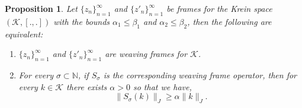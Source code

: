 \documentclass[article,12pt]{amsart}
\newtheorem{prop}[thm]{Proposition}
\begin{document}
\begin{prop}
Let $\{z_n\}_{n=1}^\infty$ and $\{z'_n\}_{n=1}^\infty$ be frames for the Krein space $(\mathcal K, [.,.])$ with the bounds $\alpha_1 \leq \beta_1$ and $\alpha_2 \leq \beta_2$, then the following are equivalent:
\begin{enumerate}
\item $\{z_n\}_{n=1}^\infty$ and $\{z'_n\}_{n=1}^\infty$ are weaving frames for $\mathcal K$.

\item For every $\sigma \subset \mathbb N$, if $S_{\sigma}$ is the corresponding weaving frame operator, then for every $k \in \mathcal K$ there exists $\alpha >0$ so that we have,
$$\|S_{\sigma}(k)\|_{J} \geq \alpha \|k\|_{J}.$$
\end{enumerate}
\end{prop}
\end{document}

